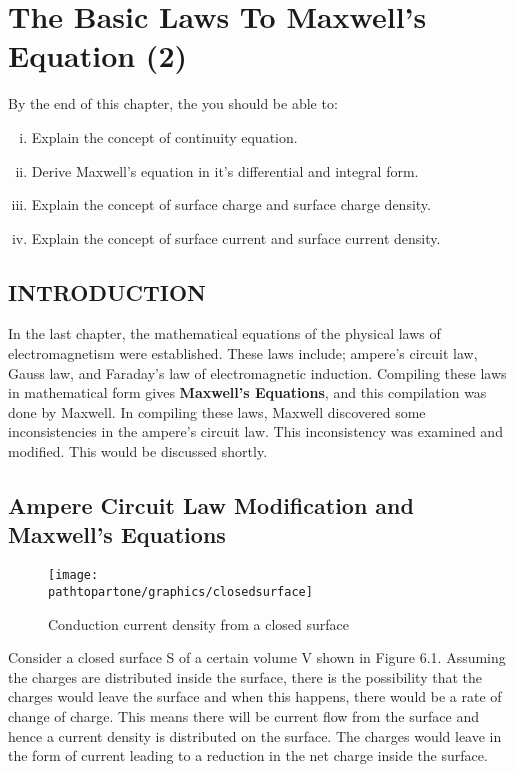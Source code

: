 \chapter{The Basic Laws To Maxwell's Equation (2)}\label{lec:lec19}


\begin{mdframed}[backgroundcolor=lightblue, linewidth=1pt, hidealllines=true]
	By the end of this chapter, the you should be able to:
	\begin{enumerate}[(i)]
			\item Explain the concept of continuity equation.
			
			\item Derive Maxwell's equation in it's differential and integral form.
			
			\item Explain the concept of surface charge and surface charge density. 
			
			\item Explain the concept of surface current and surface current density.
		\end{enumerate}
\end{mdframed}

\section{INTRODUCTION}
In the last chapter, the mathematical equations of the physical laws of electromagnetism were established. These laws include; ampere's circuit law, Gauss law, and Faraday's law of electromagnetic induction. Compiling these laws in mathematical form gives \textbf{Maxwell's Equations}, and this compilation was done by Maxwell. In compiling these laws, Maxwell discovered some inconsistencies in the ampere's circuit law. This inconsistency was examined and modified. This would be discussed shortly.

\section{Ampere Circuit Law Modification and Maxwell's Equations}
\begin{figure}[h]
	\centering
	\texttt{[image: \\pathtopartone/graphics/closedsurface]}
	\caption{Conduction current density from a closed surface}
\end{figure}

Consider a closed surface S of a certain volume V shown in Figure 6.1. Assuming the charges are distributed inside the surface, there is the possibility that the charges would leave the surface and when this happens, there would be a rate of change of charge. This means there will be current flow from the surface and hence a current density is distributed on the surface. The charges would leave in the form of current leading to a reduction in the net charge inside the surface.

